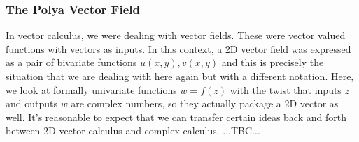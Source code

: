 




\subsubsection{The Polya Vector Field}
In vector calculus, we were dealing with vector fields. These were vector valued functions with vectors as inputs. In this context, a 2D vector field was expressed as a pair of bivariate functions $u(x,y), v(x,y)$ and this is precisely the situation that we are dealing with here again but with a different notation. Here, we look at formally univariate functions $w = f(z)$ with the twist that inputs $z$ and outputs $w$ are complex numbers, so they actually package a 2D vector as well. It's reasonable to expect that we can transfer certain ideas back and forth between 2D vector calculus and complex calculus. ...TBC...



